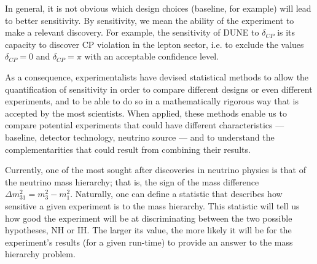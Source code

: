 \documentclass[10pt, a4paper]{article}
\begin{document}
In general, it is not obvious which design choices (baseline, for example) will lead to better
sensitivity. By sensitivity, we mean the ability of the experiment to make a
relevant discovery. For example, the sensitivity of DUNE to $\delta_{CP}$ is
its capacity to discover CP violation in the lepton sector, i.e. to exclude the
values $\delta_{CP}=0$ and $\delta_{CP}=\pi$ with an acceptable confidence
level.

As a consequence, experimentalists have devised statistical methods to allow
the quantification of sensitivity in order to compare different designs or even
different experiments, and to be able to do so in a mathematically rigorous way that is
accepted by the most scientists.
When applied, these methods enable us to compare potential experiments that
could have different characteristics --- baseline, detector technology,
neutrino source --- and to understand the complementarities that could result
from combining their results.


Currently, one of the most sought after discoveries in neutrino physics is that of the neutrino
mass hierarchy; that is, the sign of the mass difference $\Delta m^2_{31} =
m^2_3 - m^2_1$. Naturally, one can define a statistic that describes how
sensitive a given experiment is to the mass hierarchy. This
statistic will tell us how good the experiment will be at discriminating
between the two possible hypotheses, NH or IH. The larger its value, the more
likely it will be for the experiment's results (for a given run-time) to
provide an answer to the mass hierarchy problem.
\end{document}
